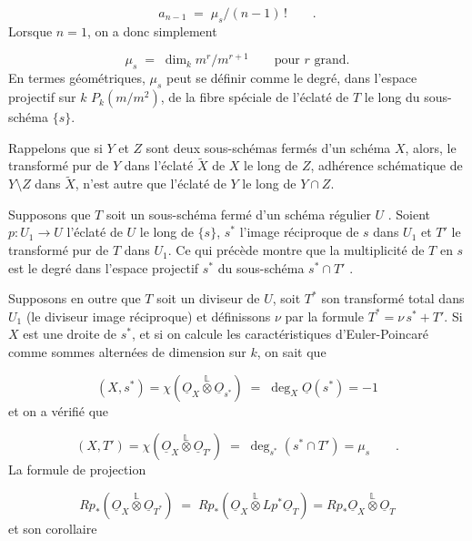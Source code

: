 \begin{equation*}
a_{n-1} \;=\; \mu_s/(n-1)\, ! \qquad .
\end{equation*}
Lorsque $n = 1$, on a donc simplement

\begin{equation*}
\mu_s \;=\; \dim_k m^r/m^{r+1} \qquad \text{pour } r \text{ grand.}
\end{equation*}
En termes géométriques, $\mu_s$ peut se définir comme le degré, dans l'espace projectif sur $k$ $P_k(m/m^2)$, de la fibre spéciale de l'éclaté de $T$ le long du sous-schéma $\{s\}$.



Rappelons que si $Y$ et $Z$ sont deux sous-schémas fermés d'un schéma $X$, alors, le transformé pur de $Y$ dans l'éclaté $\tilde{X}$ de $X$ le long de $Z$, adhérence schématique de $Y \setminus Z$ dans $\tilde{X}$, n'est autre que l'éclaté de $Y$ le long de $Y \cap Z$.

Supposons que $T$ soit un sous-schéma fermé d'un schéma régulier $U$ . Soient $p : U_1 \longrightarrow U$ l'éclaté de $U$ le long de $\{s\}$, $s^*$ l'image réciproque de $s$ dans $U_1$ et $T'$ le transformé pur de $T$ dans $U_1$. Ce qui précède montre que la multiplicité de $T$ en $s$ est le degré dans l'espace projectif $s^*$ du sous-schéma $s^* \cap T'$ .

Supposons en outre que $T$ soit un diviseur de $U$, soit $T^*$ son transformé total dans $U_1$ (le diviseur image réciproque) et définissons $\nu$ par la formule $T^* = \nu\, s^* + T'$. Si $X$ est une droite de $s^*$, et si on calcule les caractéristiques d'Euler-Poincaré comme sommes alternées de dimension sur $k$, on sait que

\begin{equation}\tag{2.6.1}
(X,s^*) = \chi(\underline{O}_X \overset{\mathbb{L}}{\otimes} \underline{O}_{s^*}) \;=\; \deg_X \underline{O}(s^*) = -1
\end{equation}
et on a vérifié que

\begin{equation}\tag{2.6.2}
(X,T') = \chi(\underline{O}_X \overset{\mathbb{L}}{\otimes} \underline{O}_{T'}) \;=\; \deg_{s^*} (s^* \cap T') = \mu_s \qquad .
\end{equation}
La formule de projection

\begin{equation*}
Rp_*(\underline{O}_X \overset{\mathbb{L}}{\otimes} \underline{O}_{T^*}) \;=\; Rp_*(\underline{O}_X \overset{\mathbb{L}}{\otimes} Lp^* \underline{O}_T) = Rp_* \underline{O}_X \overset{\mathbb{L}}{\otimes} \underline{O}_T
\end{equation*}
et son corollaire

